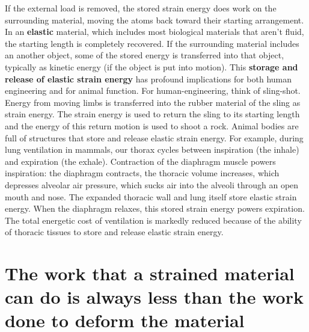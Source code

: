 \documentclass[]{book}
\begin{document}
If the external load is removed, the stored strain energy does work on
the surrounding material, moving the atoms back toward their starting
arrangement. In an \textbf{elastic} material, which includes most
biological materials that aren't fluid, the starting length is
completely recovered. If the surrounding material includes an another
object, some of the stored energy is transferred into that object,
typically as kinetic energy (if the object is put into motion). This
\textbf{storage and release of elastic strain energy} has profound
implications for both human engineering and for animal function. For
human-engineering, think of sling-shot. Energy from moving limbs is
transferred into the rubber material of the sling as strain energy. The
strain energy is used to return the sling to its starting length and the
energy of this return motion is used to shoot a rock. Animal bodies are
full of structures that store and release elastic strain energy. For
example, during lung ventilation in mammals, our thorax cycles between
inspiration (the inhale) and expiration (the exhale). Contraction of the
diaphragm muscle powers inspiration: the diaphragm contracts, the
thoracic volume increases, which depresses alveolar air pressure, which
sucks air into the alveoli through an open mouth and nose. The expanded
thoracic wall and lung itself store elastic strain energy. When the
diaphragm relaxes, this stored strain energy powers expiration. The
total energetic cost of ventilation is markedly reduced because of the
ability of thoracic tissues to store and release elastic strain energy.

\section{The work that a strained material can do is always less than
the work done to deform the
material}\label{the-work-that-a-strained-material-can-do-is-always-less-than-the-work-done-to-deform-the-material}
\end{document}
